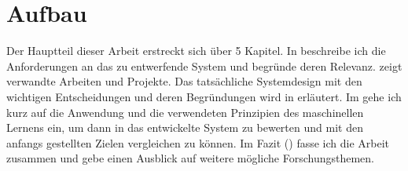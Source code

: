 \section{Aufbau}

Der Hauptteil dieser Arbeit erstreckt sich über 5 Kapitel. In 
beschreibe ich die Anforderungen an das zu entwerfende System und begründe
deren Relevanz.  zeigt verwandte Arbeiten und
Projekte. Das tatsächliche Systemdesign mit den wichtigen Entscheidungen und
deren Begründungen wird in  erläutert. Im 
gehe ich kurz auf die Anwendung und die verwendeten Prinzipien des maschinellen
Lernens ein, um dann in  das entwickelte System zu bewerten
und mit den anfangs gestellten Zielen vergleichen zu können. Im Fazit
() fasse ich die Arbeit zusammen und gebe einen Ausblick auf
weitere mögliche Forschungsthemen.


